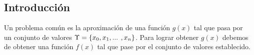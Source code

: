 \subsection{Introducción}
\par \vspace{2mm}
\noindent Un problema común es la aproximación de una función \(g(x)\) tal que pasa por un conjunto de valores \(\Large{\Upsilon} = \left \{ x_0, x_1, ... \right. \left. ,x_n \right \}\). Para lograr obtener \(g(x)\) debemos de obtener una función \(f(x)\) tal que pase por el conjunto de valores establecido.
